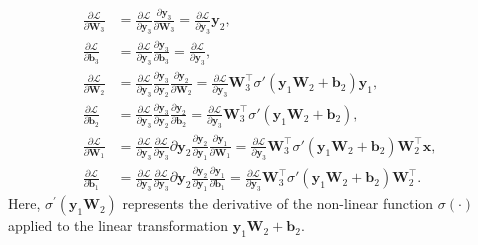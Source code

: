 \documentclass[sigconf]{acmart}
\begin{document}
    \begin{align}
        \frac{\partial \mathcal{L}}{\partial \mathbf{W}_3} &= \frac{\partial \mathcal{L}}{\partial \mathbf{y}_3} \frac{\partial \mathbf{y}_3}{\partial \mathbf{W}_3} = \frac{\partial \mathcal{L}}{\partial \mathbf{y}_3} \mathbf{y}_2, \\
        \frac{\partial \mathcal{L}}{\partial \mathbf{b}_3} &= \frac{\partial \mathcal{L}}{\partial \mathbf{y}_3} \frac{\partial \mathbf{y}_3}{\partial \mathbf{b}_3} = \frac{\partial \mathcal{L}}{\partial \mathbf{y}_3}, \\
        \frac{\partial \mathcal{L}}{\partial \mathbf{W}_2} &= \frac{\partial \mathcal{L}}{\partial \mathbf{y}_3} \frac{\partial \mathbf{y}_3}{\partial \mathbf{y}_2} \frac{\partial \mathbf{y}_2}{\partial \mathbf{W}_2} = \frac{\partial \mathcal{L}}{\partial \mathbf{y}_3} \mathbf{W}_3^\top \sigma'(\mathbf{y}_1\mathbf{W}_2 + \mathbf{b}_2) \mathbf{y}_1, \\
        \frac{\partial \mathcal{L}}{\partial \mathbf{b}_2} &= \frac{\partial \mathcal{L}}{\partial \mathbf{y}_3} \frac{\partial \mathbf{y}_3}{\partial \mathbf{y}_2} \frac{\partial \mathbf{y}_2}{\partial \mathbf{b}_2} = \frac{\partial \mathcal{L}}{\partial \mathbf{y}_3} \mathbf{W}_3^\top \sigma'(\mathbf{y}_1\mathbf{W}_2 + \mathbf{b}_2), \\
        \frac{\partial \mathcal{L}}{\partial \mathbf{W}_1} &= \frac{\partial \mathcal{L}}{\partial \mathbf{y}_3} \frac{\partial \mathcal{L}}{\partial \mathbf{y}_3}{\partial \mathbf{y}_2} \frac{\partial \mathbf{y}_2}{\partial \mathbf{y}_1} \frac{\partial \mathbf{y}_1}{\partial \mathbf{W}_1} = \frac{\partial \mathcal{L}}{\partial \mathbf{y}_3} \mathbf{W}_3^\top \sigma'(\mathbf{y}_1\mathbf{W}_2 + \mathbf{b}_2) \mathbf{W}_2^\top \mathbf{x}, \\
        \frac{\partial \mathcal{L}}{\partial \mathbf{b}_1} &= \frac{\partial \mathcal{L}}{\partial \mathbf{y}_3} \frac{\partial \mathcal{L}}{\partial \mathbf{y}_3}{\partial \mathbf{y}_2} \frac{\partial \mathbf{y}_2}{\partial \mathbf{y}_1} \frac{\partial \mathbf{y}_1}{\partial \mathbf{b}_1} = \frac{\partial \mathcal{L}}{\partial \mathbf{y}_3} \mathbf{W}_3^\top \sigma'(\mathbf{y}_1\mathbf{W}_2 + \mathbf{b}_2) \mathbf{W}_2^\top.
    \end{align}
    Here, $\sigma^{\prime}(\mathbf{y}_1\mathbf{W}_2)$ represents the derivative of the non-linear function $\sigma(\cdot)$ applied to the linear transformation $\mathbf{y}_1\mathbf{W}_2 + \mathbf{b}_2$.
    
\end{document}
